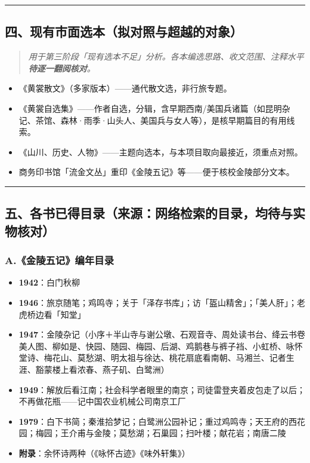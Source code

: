 \documentclass[UTF8,fontset=none,zihao=-4,a4paper]{ctexart}
\begin{document}
\medskip\hrule\medskip

\subsection{四、现有市面选本（拟对照与超越的对象）}


\begin{quote}\small\itshape
用于第三阶段「现有选本不足」分析。各本编选思路、收文范围、注释水平\textbf{待逐一翻阅核对}。
\end{quote}

\begin{itemize}
\item 《黄裳散文》（多家版本）——通代散文选，非行旅专题。
\item 《黄裳自选集》——作者自选，分辑，含早期西南/美国兵诸篇（如昆明杂记、茶馆、森林·雨季·山头人、美国兵与女人等），是核早期篇目的有用线索。
\item 《山川、历史、人物》——主题向选本，与本项目取向最接近，须重点对照。
\item 商务印书馆「流金文丛」重印《金陵五记》等——便于核校金陵部分文本。
\end{itemize}


\medskip\hrule\medskip

\subsection{五、各书已得目录（来源：网络检索的目录，\textbf{均待与实物核对}）}


\subsubsection{A.《金陵五记》编年目录}


\begin{itemize}
\item \textbf{1942}：白门秋柳
\item \textbf{1946}：旅京随笔；鸡鸣寺；关于「泽存书库」；访「盔山精舍」；「美人肝」；老虎桥边看「知堂」
\item \textbf{1947}：金陵杂记（小序＋半山寺与谢公墩、石观音寺、周处读书台、绛云书卷美人图、柳如是、快园、随园、梅园、后湖、鸡鹅巷与裤子裆、小虹桥、咏怀堂诗、梅花山、莫愁湖、明太祖与徐达、桃花扇底看南朝、马湘兰、记者生涯、豁蒙楼上看浓春、燕子矶、白鹭洲）
\item \textbf{1949}：解放后看江南；社会科学者眼里的南京；司徒雷登夹着皮包走了以后；不再做花瓶——记中国农业机械公司南京工厂
\item \textbf{1979}：白下书简；秦淮拾梦记；白鹭洲公园补记；重过鸡鸣寺；天王府的西花园；梅园；王介甫与金陵；莫愁湖；石巢园；扫叶楼；献花岩；南唐二陵
\item \textbf{附录}：余怀诗两种（《咏怀古迹》《味外轩集》）
\end{itemize}
\end{document}

